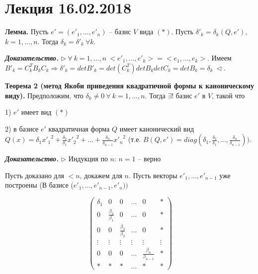 \section{Лекция 16.02.2018}

\vspace{\baselineskip}
\textbf{Лемма.} Пусть $e' = (e'_1, \dots, e'_n)$ -- базис $V$ вида $(*)$. Пусть $\delta'_k = \delta_k(Q, e')$, $k = 1, \dots, n$. Тогда $\delta_k = \delta'_k \ \forall k$.

\vspace{\baselineskip}
\textbf{\textit{Доказательство.}} $\rhd \ \forall \ k =1, \dots, n \ <e'_1, \dots, e'_k> = <e_1, \dots, e_k>$. Имеем $B'_k = C_k^T B_k C_k \Rightarrow \delta'_k = det B'_k = det(C_k^T) det B_k det C_k = det B_k = \delta_k \ \lhd$.

\vspace{\baselineskip}
\textbf{Теорема 2 (метод Якоби приведения квадратичной формы к каноническому виду).} Предположим, что $\delta_k \neq 0 \ \forall \ k =1, \dots, n$. Тогда $\exists !$ базис $e'$ в $V$, такой что

1) $e'$ имеет вид $(*)$

2) в базисе $e'$ квадратичная форма $Q$ имеет канонический вид $Q(x) = \delta_1 {x'_1}^2 + \frac{\delta_2}{\delta_1} {x'_2}^2 + \dots + \frac{\delta_n}{\delta_{n-1}} {x'_n}^2$ (т.е. $B(Q, e') = diag(\delta_1, \frac{\delta_2}{\delta_1}, \dots, \frac{\delta_n}{\delta_{n-1}}))$.

\vspace{\baselineskip}
\textbf{\textit{Доказательство.}} $\rhd$ Индукция по $n$: $n = 1$ -- верно

Пусть доказано для $<n$, докажем для $n$. Пусть векторы $e'_1, \dots, e'_{n-1}$ уже построены (В базисе ($e'_1, \dots, e'_{n-1}, e'_n))$

\begin{equation*} \begin{pmatrix} \delta_1 & 0 & 0 & \dots & 0 & * \\ 0 & \frac{\beta_2}{\beta_1} & 0 & \dots & 0 & * \\ 0 & 0 & \frac{\beta_3}{\beta_2} & \dots & 0 & * \\ \vdots & \vdots & \vdots & \vdots & \vdots & \vdots \\ 0 & 0 & 0 & \dots & \frac{\beta_n}{\beta_{n-1}} & * \\ * & * & * & \dots & * & * \end{pmatrix}
\end{equation*}

